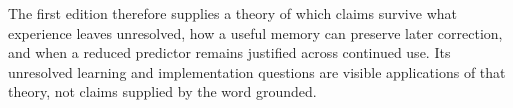 The first edition therefore supplies a theory of which claims survive what experience leaves unresolved, how a useful memory can preserve later correction, and when a reduced predictor remains justified across continued use. Its unresolved learning and implementation questions are visible applications of that theory, not claims supplied by the word grounded.

\FloatBarrier
